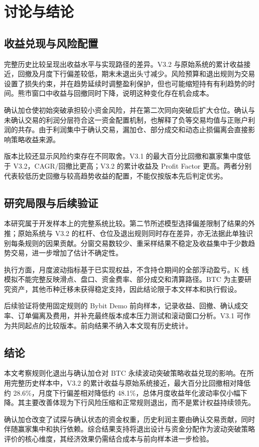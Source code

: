 \section{讨论与结论}

\subsection{收益兑现与风险配置}

完整历史比较呈现出收益水平与实现路径的差异。V3.2 与原始系统的累计收益接近，回撤及月度下行偏差较低，期末未退出头寸减少。风险预算和退出规则为交易设置了损失约束，并在趋势延续时调整盈利保护，但也可能缩短持有有利趋势的时间。熊市窗口中收益与回撤同时下降，说明这种变化存在机会成本。

确认加仓使初始突破承担较小资金风险，并在第二次同向突破后扩大仓位。确认与未确认交易的利润分层符合这一资金配置机制，也解释了负等交易均值与正账户利润的共存。由于利润集中于确认交易，漏加仓、部分成交和动态止损偏离会直接影响策略收益来源。

版本比较还显示风险约束存在不同取舍。V3.1 的最大百分比回撤和赢家集中度低于 V3.2，CAGR/回撤比更高；V3.2 的累计收益及 Profit Factor 更高。两者分别代表较低历史回撤与较高趋势收益的配置，不能仅按版本先后判定优劣。

\subsection{研究局限与后续验证}

本研究属于开发样本上的完整系统比较。第二节所述模型选择偏差限制了结果的外推；原始系统与 V3.2 的杠杆、仓位及退出规则同时存在差异，亦无法据此单独识别每条规则的因果贡献。分窗交易数较少、重采样结果不稳定及收益集中于少数趋势交易，进一步增加了估计不确定性。

执行方面，月度波动指标基于已实现权益，不含持仓期间的全部浮动盈亏。K 线模拟不能完整反映滑点、盘口、资金费率、部分成交和清算路径。BTC 为主要研究资产，其他币种迁移未获得稳定支持，因此结论限于本文样本和执行假设。

后续验证将使用固定规则的 Bybit Demo 前向样本，记录收益、回撤、确认成交率、订单偏离及费用，并补充最终版本成本压力测试和滚动窗口分析。V3.1 可作为共同起点的比较版本。前向结果不纳入本文现有历史统计。

\subsection{结论}

本文考察规则化退出与确认加仓对 BTC 永续波动突破策略收益兑现的影响。在所用完整历史样本中，V3.2 的累计收益与原始系统接近，最大百分比回撤相对降低约 28.6\%，月度下行偏差相对降低约 48.1\%，总体月度收益年化波动率仅小幅下降。其主要改善体现为下行风险压缩和正常规则退出，而不是累计权益持续领先。

确认加仓改变了试探与确认状态的资金权重，历史利润主要由确认交易贡献，同时伴随赢家集中和执行依赖。综合结果支持将退出设计与资金分配作为波动突破策略评价的核心维度，其经济效果仍需结合成本与前向样本进一步检验。
